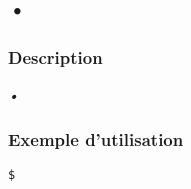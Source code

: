 \subsection{•}
\subsubsection{Description}
\emph{•}

\subsubsection{Exemple d'utilisation}

\begin{lstlisting}
$
\end{lstlisting}
